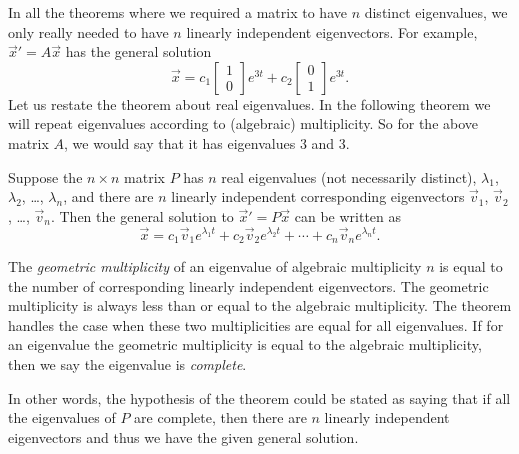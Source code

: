 In all the
theorems where we required a matrix to have $n$ distinct eigenvalues, we only
really needed to have $n$ linearly independent eigenvectors.  For example,
${\vec{x}}' = A\vec{x}$ has the general solution
\begin{equation*}
\vec{x} = 
c_1 \begin{bmatrix} 1 \\ 0 \end{bmatrix} e^{3t}
+ c_2 \begin{bmatrix} 0 \\ 1 \end{bmatrix} e^{3t} .
\end{equation*}
Let us restate the theorem about real eigenvalues.  In the following theorem
we will repeat eigenvalues according to (algebraic) multiplicity.  So
for the above matrix $A$, we would say that it has eigenvalues 3 and 3.

\begin{theorem}
Suppose the $n \times n$ matrix $P$ 
has $n$ real eigenvalues (not necessarily distinct), $\lambda_1$,
$\lambda_2$, \ldots, $\lambda_n$,
and there are $n$ linearly independent corresponding eigenvectors
$\vec{v}_1$, $\vec{v}_2$, \ldots, $\vec{v}_n$.  Then the general solution to 
${\vec{x}}' = P\vec{x}$
can be written as
\begin{equation*}
\vec{x} = c_1 \vec{v}_1 e^{\lambda_1 t} +
c_2 \vec{v}_2 e^{\lambda_2 t} + \cdots +
c_n \vec{v}_n e^{\lambda_n t} .
\end{equation*}
\end{theorem}

The \emph{geometric multiplicity} of an eigenvalue of algebraic multiplicity $n$
is equal to the number of corresponding linearly independent eigenvectors.
The geometric multiplicity is always less than or
equal to the algebraic multiplicity.  The theorem handles the case
when these two multiplicities are equal for all eigenvalues.
If for an eigenvalue the geometric multiplicity is equal
to the algebraic multiplicity, then we say the eigenvalue is
\emph{complete}.

In other words, 
the hypothesis of the theorem could be stated as saying that if all
the eigenvalues of $P$ are complete, then there are $n$ linearly independent
eigenvectors and thus we have the given general solution.

\medskip

